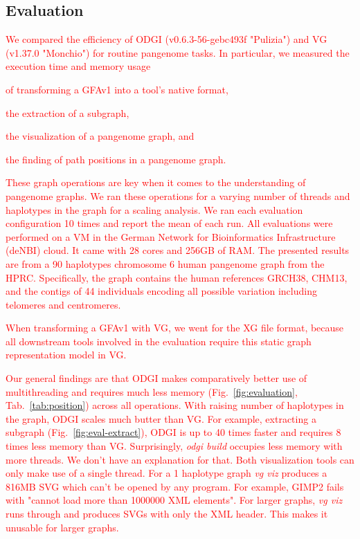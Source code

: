\documentclass{bioinfo}
\newcommand{\REVIEWED}[1]{{\textcolor{Red}{#1}}}
\begin{document}
\subsection{Evaluation}
\label{Evaluation}

\REVIEWED{We compared the efficiency of ODGI (v0.6.3-56-gebc493f "Pulizia") and VG (v1.37.0 "Monchio") for routine pangenome tasks. In particular, we measured the execution time and memory usage}
\begin{inparaenum}[(i)]
	\item \REVIEWED{of transforming a GFAv1 into a tool's native format, }
	\item \REVIEWED{the extraction of a subgraph,}
	\item \REVIEWED{the visualization of a pangenome graph, and}
	\item \REVIEWED{the finding of path positions in a pangenome graph.}
\end{inparaenum}
\REVIEWED{These graph operations are key when it comes to the understanding of pangenome graphs. We ran these operations for a varying number of threads and haplotypes in the graph for a scaling analysis. We ran each evaluation configuration 10 times and report the mean of each run.
All evaluations were performed on a VM in the German Network for Bioinformatics Infrastructure (deNBI) cloud. It came with 28 cores and 256GB of RAM.
The presented results are from a 90 haplotypes chromosome 6 human pangenome graph from the HPRC. Specifically, the graph contains the human references GRCH38, CHM13, and the contigs of 44 individuals encoding all possible variation including telomeres and centromeres. }

\REVIEWED{When transforming a GFAv1 with VG, we went for the XG file format, because all downstream tools involved in the evaluation require this static graph representation model in VG.}

\REVIEWED{Our general findings are that ODGI makes comparatively better use of multithreading and requires much less memory (Fig.~\ref{fig:evaluation}, Tab.~\ref{tab:position}) across all operations. With raising number of haplotypes in the graph, ODGI scales much butter than VG. For example, extracting a subgraph (Fig.~\ref{fig:eval-extract}), ODGI is up to 40 times faster and requires 8 times less memory than VG. Surprisingly, \textit{odgi build} occupies less memory with more threads. We don't have an explanation for that. 
}
\REVIEWED{Both visualization tools can only make use of a single thread. For a 1 haplotype graph \textit{vg viz} produces a 816MB SVG which can't be opened by any program. For example, GIMP2 fails with "cannot load more than 1000000 XML elements". For larger graphs, \textit{vg viz} runs through and produces SVGs with only the XML header. This makes it unusable for larger graphs.}
\end{document}
